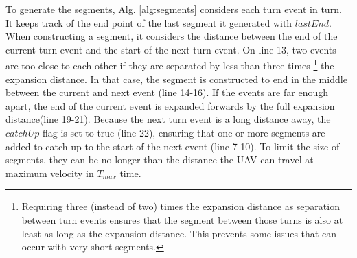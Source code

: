 To generate the segments, Alg. \ref{alg:segments} considers each turn event in turn. It keeps track of the end point of the last segment it generated with $lastEnd$. When constructing a segment, it considers the distance between the end of the current turn event and the start of the next turn event. On line 13, two events are too close to each other if they are separated by less than three times \footnote{Requiring three (instead of two) times the expansion distance as separation between turn events ensures that the segment between those turns is also at least as long as the expansion distance. This prevents some issues that can occur with very short segments.} the expansion distance. In that case, the segment is constructed to end in the middle between the current and next event (line 14-16). If the events are far enough apart, the end of the current event is expanded forwards by the full expansion distance(line 19-21). Because the next turn event is a long distance away, the $catchUp$ flag is set to true (line 22), ensuring that one or more segments are added to catch up to the start of the next event (line 7-10). To limit the size of segments, they can be no longer than the distance the UAV can travel at maximum velocity in $T_{max}$ time.
